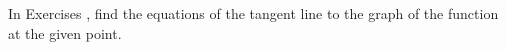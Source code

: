 {\noindent In Exercises}
{, find the equations of the tangent line %
to the graph of the function at the given point.
}
